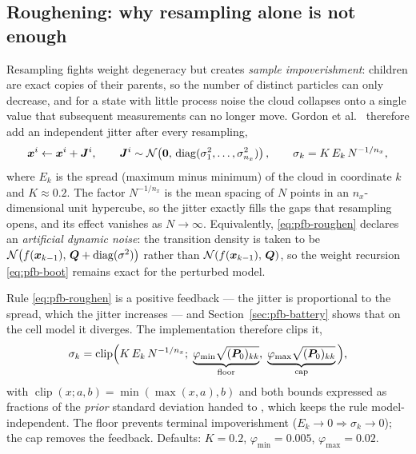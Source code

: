 \subsection{Roughening: why resampling alone is not enough}
Resampling fights weight degeneracy but creates \emph{sample impoverishment}: children are exact
copies of their parents, so the number of distinct particles can only decrease, and for a state
with little process noise the cloud collapses onto a single value that subsequent measurements can
no longer move.  Gordon et al.\ \cite[\S4.2]{gordon1993} therefore add an independent jitter after
every resampling,
\begin{equation}
  \bm{x}^i \leftarrow \bm{x}^i + \bm{J}^i, \qquad
  \bm{J}^i \sim \mathcal{N}\!\left(\bm{0},\,\operatorname{diag}(\sigma_1^2,\dots,\sigma_{n_x}^2)\right), \qquad
  \sigma_k = K\, E_k\, N^{-1/n_x},
  \label{eq:pfb-roughen}
\end{equation}
where $E_k$ is the spread (maximum minus minimum) of the cloud in coordinate $k$ and $K \approx
0.2$.  The factor $N^{-1/n_x}$ is the mean spacing of $N$ points in an $n_x$-dimensional unit
hypercube, so the jitter exactly fills the gaps that resampling opens, and its effect vanishes as
$N\to\infty$.  Equivalently, \eqref{eq:pfb-roughen} declares an \emph{artificial dynamic noise}:
the transition density is taken to be
$\mathcal{N}\!\left(f(\bm{x}_{k-1}),\,\bm{Q} + \operatorname{diag}(\sigma^2)\right)$ rather than $\mathcal{N}\!\left(f(\bm{x}_{k-1}),\,\bm{Q}\right)$, so the weight
recursion \eqref{eq:pfb-boot} remains exact for the perturbed model.

Rule \eqref{eq:pfb-roughen} is a positive feedback --- the jitter is proportional to the spread,
which the jitter increases --- and Section~\ref{sec:pfb-battery} shows that on the cell model it
diverges.  The implementation therefore clips it,
\begin{equation}
  \sigma_k = \operatorname{clip}\!\Big( K\,E_k\,N^{-1/n_x};\;
      \underbrace{\varphi_{\min}\sqrt{(\bm{P}_0)_{kk}}}_{\text{floor}},\;
      \underbrace{\varphi_{\max}\sqrt{(\bm{P}_0)_{kk}}}_{\text{cap}} \Big),
  \label{eq:pfb-roughen-clip}
\end{equation}
with $\operatorname{clip}(x;a,b)=\min(\max(x,a),b)$ and both bounds expressed as fractions of the \emph{prior}
standard deviation handed to , which keeps the rule model-independent.  The floor
prevents terminal impoverishment ($E_k \to 0 \Rightarrow \sigma_k \to 0$); the cap removes the
feedback.  Defaults: $K = 0.2$, $\varphi_{\min} = 0.005$, $\varphi_{\max}=0.02$.

